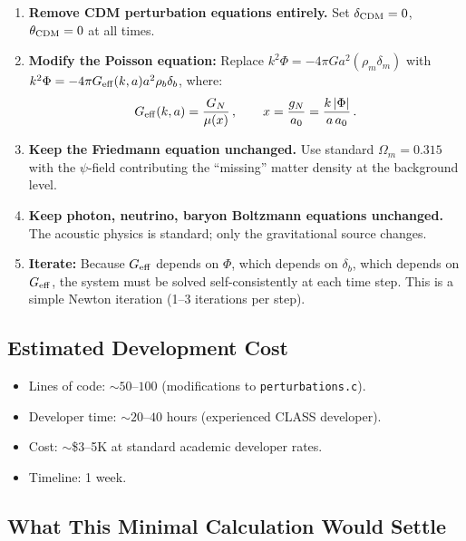 \documentclass[11pt]{article}
\newcommand{\Geff}{G_{\rm eff}}
\newcommand{\aM}{a_0}
\newcommand{\Om}{\Omega_m}
\begin{document}
\begin{enumerate}
\item \textbf{Remove CDM perturbation equations entirely.}
  Set $\delta_{\rm CDM} = 0$, $\theta_{\rm CDM} = 0$ at all times.

\item \textbf{Modify the Poisson equation:}
  Replace $k^2\Phi = -4\pi G a^2(\rho_m\delta_m)$ with
  $k^2\Phi = -4\pi \Geff(k,a) a^2 \rho_b\delta_b$, where:
  \begin{equation}
  \Geff(k,a) = \frac{G_N}{\mu(x)}\,,\qquad
  x = \frac{g_N}{\aM} = \frac{k\,|\Phi|}{a\,\aM}\,.
  \end{equation}

\item \textbf{Keep the Friedmann equation unchanged.}
  Use standard $\Om = 0.315$ with the $\psi$-field contributing the
  ``missing'' matter density at the background level.

\item \textbf{Keep photon, neutrino, baryon Boltzmann equations unchanged.}
  The acoustic physics is standard; only the gravitational source changes.

\item \textbf{Iterate:}  Because $\Geff$ depends on $\Phi$, which depends
  on $\delta_b$, which depends on $\Geff$, the system must be solved
  self-consistently at each time step.  This is a simple Newton iteration
  (1--3 iterations per step).
\end{enumerate}

\subsection{Estimated Development Cost}

\begin{itemize}
\item Lines of code: $\sim 50$--$100$ (modifications to \texttt{perturbations.c}).
\item Developer time: $\sim 20$--$40$ hours (experienced CLASS developer).
\item Cost: $\sim$\$3--5K at standard academic developer rates.
\item Timeline: 1 week.
\end{itemize}

\subsection{What This Minimal Calculation Would Settle}
\end{document}
